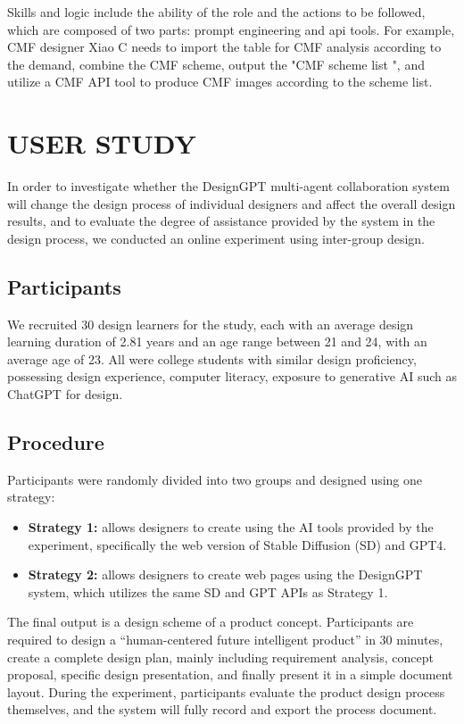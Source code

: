 \documentclass[10pt, conference, compsocconf]{IEEEtran}
\begin{document}
Skills and logic include the ability of the role and the actions to be followed, which are composed of two parts: prompt engineering and api tools. For example, CMF designer Xiao C needs to import the table for CMF analysis according to the demand, combine the CMF scheme, output the "CMF scheme list ", and utilize a CMF API tool to produce CMF images according to the scheme list.

\section{USER STUDY}
In order to investigate whether the DesignGPT multi-agent collaboration system will change the design process of individual designers and affect the overall design results, and to evaluate the degree of assistance provided by the system in the design process, we conducted an online experiment using inter-group design.

\subsection{Participants}
We recruited 30 design learners for the study, each with an average design learning duration of 2.81 years and an age range between 21 and 24, with an average age of 23. All were college students with similar design proficiency, possessing design experience, computer literacy, exposure to generative AI such as ChatGPT for design.

\subsection{Procedure}
Participants were randomly divided into two groups and designed using one strategy:
\begin{itemize}
  \item \textbf{Strategy 1:} allows designers to create using the AI tools provided by the experiment, specifically the web version of Stable Diffusion (SD) and GPT4.
  \item \textbf{Strategy 2:} allows designers to create web pages using the DesignGPT system, which utilizes the same SD and GPT APIs as Strategy 1.
\end{itemize}
The final output is a design scheme of a product concept. Participants are required to design a “human-centered future intelligent product” in 30 minutes, create a complete design plan, mainly including requirement analysis, concept proposal, specific design presentation, and finally present it in a simple document layout. During the experiment, participants evaluate the product design process themselves, and the system will fully record and export the process document.
\end{document}
